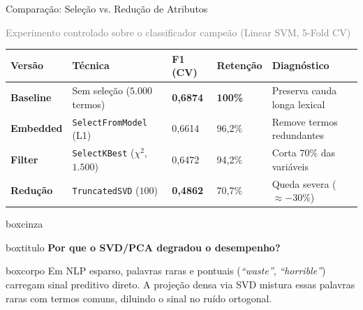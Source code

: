 \documentclass[aspectratio=43]{beamer}
\begin{document}
\begin{frame}[t]{Comparação: Seleção vs. Redução de Atributos}

\textcolor{gray}{\small Experimento controlado sobre o classificador campeão (Linear SVM, 5-Fold CV)}

\vspace{0.08cm}

\scriptsize
\renewcommand{\arraystretch}{1.12}
\begin{center}
\begin{tabular}{P{1.45cm} P{2.55cm} P{1.05cm} P{1.05cm} P{2.55cm}}
\toprule
\textbf{Versão} & \textbf{Técnica} & \textbf{F1 (CV)} & \textbf{Retenção} & \textbf{Diagnóstico} \\
\midrule
\textbf{Baseline} & Sem seleção ($5.000$ termos) & \textbf{0,6874} & \textbf{100\%} & Preserva cauda longa lexical \\
\textbf{Embedded} & \texttt{SelectFromModel} (L1) & 0,6614 & 96,2\% & Remove termos redundantes \\
\textbf{Filter} & \texttt{SelectKBest} ($\chi^2$, $1.500$) & 0,6472 & 94,2\% & Corta $70\%$ das variáveis \\
\textbf{Redução} & \texttt{TruncatedSVD} ($100$) & \textbf{0,4862} & 70,7\% & Queda severa ($\approx -30\%$) \\
\bottomrule
\end{tabular}
\end{center}

\vspace{0.04cm}

\begin{center}
\begin{beamercolorbox}[wd=0.96\textwidth, sep=0pt]{boxcinza}
  \begin{beamercolorbox}[wd=0.96\textwidth, ht=0.38cm, dp=0.06cm, leftskip=0.2cm]{boxtitulo}
    {\color{uelgreen}\scriptsize\textbf{Por que o SVD/PCA degradou o desempenho?}}
  \end{beamercolorbox}
  \begin{beamercolorbox}[wd=0.96\textwidth, sep=0.14cm]{boxcorpo}
    \scriptsize Em NLP esparso, palavras raras e pontuais (\textit{``waste''}, \textit{``horrible''}) carregam sinal preditivo direto. A projeção densa via SVD mistura essas palavras raras com termos comuns, diluindo o sinal no ruído ortogonal.
  \end{beamercolorbox}
\end{beamercolorbox}
\end{center}

\end{frame}
\end{document}
